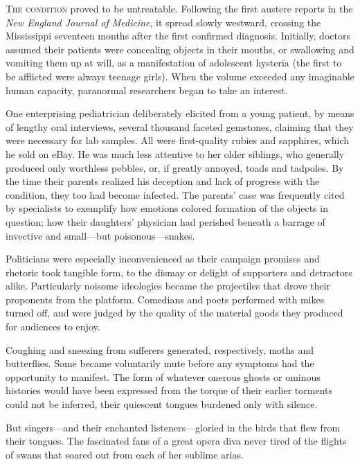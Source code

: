 
\lettrine{T}{he condition} proved to be untreatable. Following the first austere
reports in the \emph{New England Journal of Medicine}, it spread slowly
westward, crossing the Mississippi seventeen months after the first
confirmed diagnosis. Initially, doctors assumed their patients were
concealing objects in their mouths, or swallowing and vomiting them up
at will, as a manifestation of adolescent hysteria (the first to be
afflicted were always teenage girls). When the volume exceeded any
imaginable human capacity, paranormal researchers began to take an
interest.

One enterprising pediatrician deliberately elicited from a young
patient, by means of lengthy oral interviews, several thousand faceted
gemstones, claiming that they were necessary for lab samples. All were
first-quality rubies and sapphires, which he sold on eBay. He was much
less attentive to her older siblings, who generally produced only
worthless pebbles, or, if greatly annoyed, toads and tadpoles. By the
time their parents realized his deception and lack of progress with the
condition, they too had become infected. The parents' case was
frequently cited by specialists to exemplify how emotions colored
formation of the objects in question; how their daughters' physician had
perished beneath a barrage of invective and small---but
poisonous---snakes.

Politicians were especially inconvenienced as their campaign promises
and rhetoric took tangible form, to the dismay or delight of supporters
and detractors alike. Particularly noisome ideologies became the
projectiles that drove their proponents from the platform. Comedians and
poets performed with mikes turned off, and were judged by the quality of
the material goods they produced for audiences to enjoy.

Coughing and sneezing from sufferers generated, respectively, moths and
butterflies. Some became voluntarily mute before any symptoms had the
opportunity to manifest. The form of whatever onerous ghosts or ominous
histories would have been expressed from the torque of their earlier
torments could not be inferred, their quiescent tongues burdened only
with silence.

But singers---and their enchanted listeners---gloried in the birds that
flew from their tongues. The fascinated fans of a great opera diva never
tired of the flights of swans that soared out from each of her sublime
arias.

